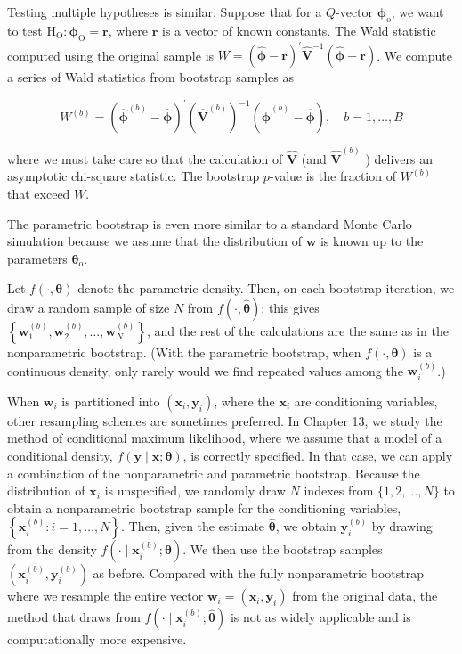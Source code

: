 \documentclass[10pt]{article}
\begin{document}
Testing multiple hypotheses is similar. Suppose that for a $Q$-vector $\boldsymbol{\phi}_{\mathrm{o}}$, we want to test $\mathrm{H}_{\mathrm{O}}: \boldsymbol{\phi}_{\mathrm{O}}=\mathbf{r}$, where $\mathbf{r}$ is a vector of known constants. The Wald statistic computed using the original sample is $W=(\hat{\boldsymbol{\phi}}-\mathbf{r})^{\prime} \hat{\mathbf{V}}^{-1}(\hat{\boldsymbol{\phi}}-\mathbf{r})$. We compute a series of Wald statistics from bootstrap samples as

$$
W^{(b)}=\left(\hat{\boldsymbol{\phi}}^{(b)}-\hat{\boldsymbol{\phi}}\right)^{\prime}\left(\hat{\mathbf{V}}^{(b)}\right)^{-1}\left(\hat{\boldsymbol{\phi}}^{(b)}-\hat{\boldsymbol{\phi}}\right), \quad b=1, \ldots, B
$$

where we must take care so that the calculation of $\hat{\mathbf{V}}$ (and $\hat{\mathbf{V}}^{(b)}$ ) delivers an asymptotic chi-square statistic. The bootstrap $p$-value is the fraction of $W^{(b)}$ that exceed $W$.

The parametric bootstrap is even more similar to a standard Monte Carlo simulation because we assume that the distribution of $\mathbf{w}$ is known up to the parameters $\boldsymbol{\theta}_{\mathrm{o}}$.

Let $f(\cdot, \boldsymbol{\theta})$ denote the parametric density. Then, on each bootstrap iteration, we draw a random sample of size $N$ from $f(\cdot, \hat{\boldsymbol{\theta}})$; this gives $\left\{\mathbf{w}_{1}^{(b)}, \mathbf{w}_{2}^{(b)}, \ldots, \mathbf{w}_{N}^{(b)}\right\}$, and the rest of the calculations are the same as in the nonparametric bootstrap. (With the parametric bootstrap, when $f(\cdot, \boldsymbol{\theta})$ is a continuous density, only rarely would we find repeated values among the $\mathbf{w}_{i}^{(b)}$.)

When $\mathbf{w}_{i}$ is partitioned into $\left(\mathbf{x}_{i}, \mathbf{y}_{i}\right)$, where the $\mathbf{x}_{i}$ are conditioning variables, other resampling schemes are sometimes preferred. In Chapter 13, we study the method of conditional maximum likelihood, where we assume that a model of a conditional density, $f(\mathbf{y} \mid \mathbf{x} ; \boldsymbol{\theta})$, is correctly specified. In that case, we can apply a combination of the nonparametric and parametric bootstrap. Because the distribution of $\mathbf{x}_{i}$ is unspecified, we randomly draw $N$ indexes from $\{1,2, \ldots, N\}$ to obtain a nonparametric bootstrap sample for the conditioning variables, $\left\{\mathbf{x}_{i}^{(b)}: i=1, \ldots, N\right\}$. Then, given the estimate $\hat{\boldsymbol{\theta}}$, we obtain $\mathbf{y}_{i}^{(b)}$ by drawing from the density $f\left(\cdot \mid \mathbf{x}_{i}^{(b)} ; \hat{\boldsymbol{\theta}}\right)$. We then use the bootstrap samples $\left(\mathbf{x}_{i}^{(b)}, \mathbf{y}_{i}^{(b)}\right)$ as before. Compared with the fully nonparametric bootstrap where we resample the entire vector $\mathbf{w}_{i}=\left(\mathbf{x}_{i}, \mathbf{y}_{i}\right)$ from the original data, the method that draws from $f\left(\cdot \mid \mathbf{x}_{i}^{(b)} ; \hat{\boldsymbol{\theta}}\right)$ is not as widely applicable and is computationally more expensive.
\end{document}

